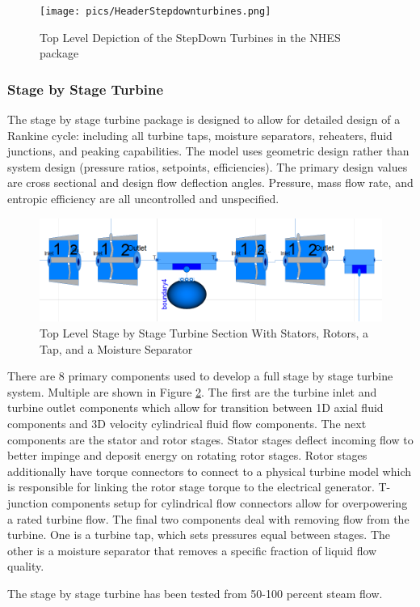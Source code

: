 \begin{figure}[hbtp]
\centering
\texttt{[image: pics/HeaderStepdownturbines.png]}
\caption{Top Level Depiction of the StepDown Turbines in the NHES package}
\label{Top View Step Down Turbines}
\end{figure}


\subsubsection{Stage by Stage Turbine}
The stage by stage turbine package is designed to allow for detailed design of a Rankine cycle: including all turbine taps, moisture separators, reheaters, fluid junctions, and peaking capabilities. The model uses geometric design rather than system design (pressure ratios, setpoints, efficiencies). The primary design values are cross sectional and design flow deflection angles. Pressure, mass flow rate, and entropic efficiency are all uncontrolled and unspecified. 


\begin{figure}[hbtp]
\centering
\includegraphics[scale=0.75]{pics/StagebyStageTurbine.png}
\caption{Top Level Stage by Stage Turbine Section With Stators, Rotors, a Tap, and a Moisture Separator}
\label{TVSbST}
\end{figure}


There are 8 primary components used to develop a full stage by stage turbine system. Multiple are shown in Figure \ref{TVSbST}. The first are the turbine inlet and turbine outlet components which allow for transition between 1D axial fluid components and 3D velocity cylindrical fluid flow components. The next components are the stator and rotor stages. Stator stages deflect incoming flow to better impinge and deposit energy on rotating rotor stages. Rotor stages additionally have torque connectors to connect to a physical turbine model which is responsible for linking the rotor stage torque to the electrical generator. T-junction components setup for cylindrical flow connectors allow for overpowering a rated turbine flow. The final two components deal with removing flow from the turbine. One is a turbine tap, which sets pressures equal between stages. The other is a moisture separator that removes a specific fraction of liquid flow quality. 

The stage by stage turbine has been tested from 50-100 percent steam flow. 




%
